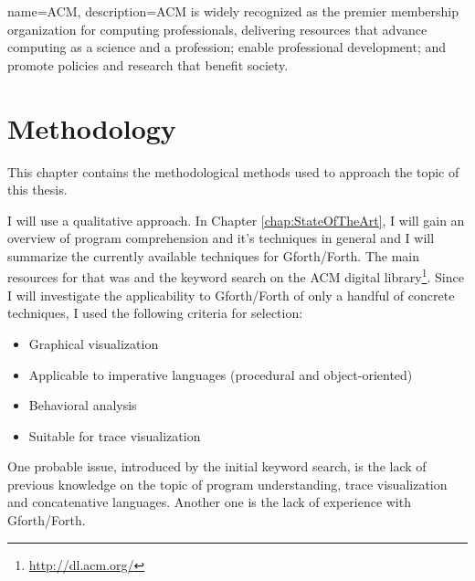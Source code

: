 {
  name={ACM},
  description={ACM is widely recognized as the premier membership organization for computing professionals, delivering resources that advance computing as a science and a profession; enable professional development; and promote policies and research that benefit society.}
}


\chapter{Methodology}
\label{chap:Methodology}

This chapter contains the methodological methods used to approach the topic of this thesis.

I will use a qualitative approach. In Chapter \ref{chap:StateOfTheArt}, I will gain an overview of program comprehension and it's techniques in general and I will summarize the currently available techniques for Gforth/Forth. The main resources for that was \cite{Cornelissen:2009:SSP:1638616.1639301} and the keyword search on the \gls{ACM} digital library\footnote{\url{http://dl.acm.org/}}.
Since I will investigate the applicability to Gforth/Forth of only a handful of concrete techniques, I used the following criteria for selection:
\begin{itemize}
\item Graphical visualization 
\item Applicable to imperative languages (procedural and object-oriented)
\item Behavioral analysis
\item Suitable for trace visualization
\end{itemize}
One probable issue, introduced by the initial keyword search, is the lack of previous knowledge on the topic of program understanding, trace visualization and concatenative languages. Another one is the lack of experience with Gforth/Forth.


